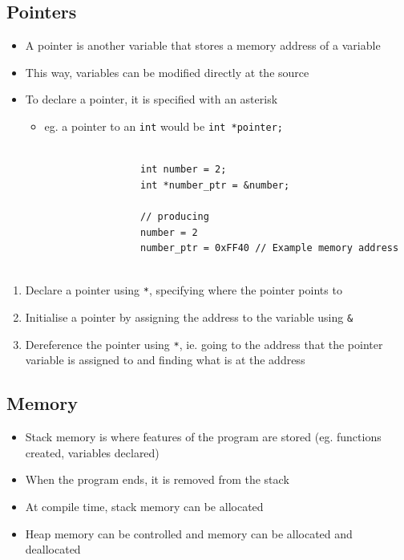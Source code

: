 \documentclass{article}
\begin{document}
	\subsection{Pointers}
		
		\begin{itemize}
			\item A pointer is another variable that stores a memory address of a variable
			\item This way, variables can be modified directly at the source
			\item To declare a pointer, it is specified with an asterisk
				\begin{itemize}
					\item eg. a pointer to an \texttt{int} would be \texttt{int *pointer;}

				\end{itemize}

				\begin{verbatim}

					int number = 2;
					int *number_ptr = &number;

					// producing
					number = 2
					number_ptr = 0xFF40 // Example memory address
						
				\end{verbatim}
		\end{itemize}

		\begin{enumerate}
			\item Declare a pointer using \texttt{*}, specifying where the pointer points to
			\item Initialise a pointer by assigning the address to the variable using \texttt{&}
			\item Dereference the pointer using \texttt{*}, ie. going to the address that the pointer variable is assigned to and finding what is at the address
		\end{enumerate}

	\subsection{Memory}

		\begin{itemize}
			\item Stack memory is where features of the program are stored (eg. functions created, variables declared)
			\item When the program ends, it is removed from the stack
			\item At compile time, stack memory can be allocated
			\item Heap memory can be controlled and memory can be allocated and deallocated
		\end{itemize}
\end{document}
